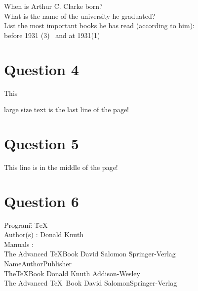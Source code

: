 \documentclass[a4paper,12pt]{article}
\begin{document}
{\large 
When is Arthur C. Clarke born?\hrulefill\\
What is the name of the university he graduated?\hrulefill\\
List the most important books he has read (according to him):\\
before 1931 (3) \hrulefill\hrulefill\hrulefill\ and at 1931(1)\hrulefill}

\section{Question 4}
This {\large large size text is the last line of the page!\par}\pagebreak
\newpage
\section{Question 5}
\newpage

This line is in the middle of the page!
\pagebreak

\section{Question 6}

\begin{tabbing}
	
Program\qquad \=: \= \TeX\\[5pt]
Author(s) \>: \> Donald Knuth\\[5pt]
Manuals \>:\\
\quad\= The Advanced \TeX Book \quad\= David Salomon
\quad\=Springer-Verlag\kill\\
\>\textsf{Name}\>\textsf{Author}\>\textsf{Publisher}\\[8pt]
\>The\TeX Book \>Donald Knuth \>Addison-Wesley\\[5pt]
\>The Advanced \TeX \ Book \>David Salomon\>Springer-Verlag\\[5pt]

\end{tabbing}
\end{document}
